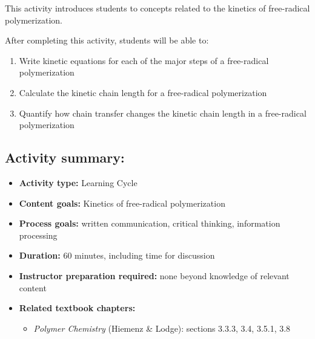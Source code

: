 %
%
%
%

\renewcommand{\figpath}{content}
\renewcommand{\labelbase}{FRPkinetics}

\begin{activity}

\begin{instructornotes}
	This activity introduces students to concepts related to the kinetics of free-radical polymerization.
	
	After completing this activity, students will be able to:
	\begin{enumerate}
		\item Write kinetic equations for each of the major steps of a free-radical polymerization
		\item Calculate the kinetic chain length for a free-radical polymerization
		\item Quantify how chain transfer changes the kinetic chain length in a free-radical polymerization
	\end{enumerate}
	
	\subsection*{Activity summary:}
	\begin{itemize}
		\item \textbf{Activity type:} Learning Cycle
		\item \textbf{Content goals:} Kinetics of free-radical polymerization
		\item \textbf{Process goals:} %
			written communication, critical thinking, information processing
		\item \textbf{Duration:} 60 minutes, including time for discussion
		\item \textbf{Instructor preparation required:} none beyond knowledge of relevant content
		\item \textbf{Related textbook chapters:}
			\begin{itemize}
				\item \emph{Polymer Chemistry} (Hiemenz \& Lodge): sections 3.3.3, 3.4, 3.5.1, 3.8
			\end{itemize}
	\end{itemize}
	

\end{instructornotes}
\end{activity}
